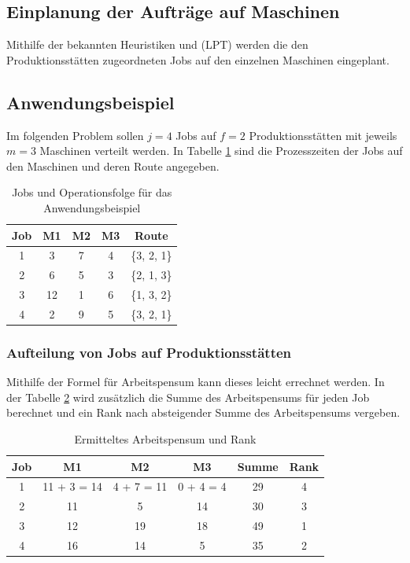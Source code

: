 \documentclass[final, english, ngerman, a4paper, 12pt, %
numbers=noenddot,
cd=true,
cdfont=false,cdfont=nohead,cdfont=nodin,
cdmath=false,
cdhead=false,
cdfoot=true,
cdcover=monochrome,
cdgeometry=symmetric,
declaration=heading,
declaration=notoc,
abstract=heading,
]{tudscrreprt}
\begin{document}
\subsection{Einplanung der Aufträge auf Maschinen}
Mithilfe der bekannten Heuristiken  und  (LPT) werden die den Produktionsstätten zugeordneten Jobs auf den einzelnen Maschinen eingeplant.

\subsection{Anwendungsbeispiel}
Im folgenden Problem sollen $j=4$ Jobs auf $f=2$ Produktionsstätten mit jeweils $m=3$ Maschinen verteilt werden. In Tabelle \ref{tab:problem} sind die Prozesszeiten der Jobs auf den Maschinen und deren Route angegeben. 

\begin{table}[H]
	\centering
	\begin{tabular}{ccccc}
		\toprule
		Job & M1 & M2 & M3 & Route \\
		\midrule
		1   & 3  & 7  & 4  & \{3, 2, 1\} \\
		2   & 6  & 5  & 3  & \{2, 1, 3\} \\
		3   & 12 & 1  & 6  & \{1, 3, 2\} \\
		4   & 2  & 9  & 5  & \{3, 2, 1\} \\
		\bottomrule
	\end{tabular}
	\caption{Jobs und Operationsfolge für das Anwendungsbeispiel}
	\label{tab:problem}
\end{table}

\subsubsection{Aufteilung von Jobs auf Produktionsstätten}
Mithilfe der Formel für Arbeitspensum kann dieses leicht errechnet werden. In der Tabelle \ref{tab:pensum} wird zusätzlich die Summe des Arbeitspensums für jeden Job berechnet und ein Rank nach absteigender Summe des Arbeitspensums vergeben.

\begin{table}[H]
	\centering
	\begin{tabular}{cccccc}
		\toprule
		Job & M1 & M2 & M3 & Summe & Rank \\
		\midrule
		1   & 11 + 3 = 14 & 4 + 7 = 11 & 0 + 4 = 4 & 29 & 4 \\
		2   & 11 & 5 & 14 & 30 & 3  \\
		3   & 12 & 19 & 18 & 49 & 1  \\
		4   & 16 & 14 & 5 & 35 & 2  \\
		\bottomrule
	\end{tabular}
	\caption{Ermitteltes Arbeitspensum und Rank}
	\label{tab:pensum}
\end{table}
\end{document}

